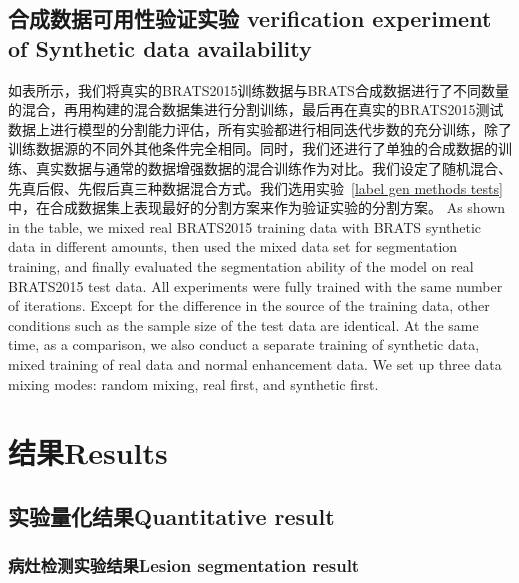 \documentclass[letterpaper]{article} %
\begin{document}
\subsection{合成数据可用性验证实验 verification experiment of Synthetic data availability}
如表所示，我们将真实的BRATS2015训练数据与BRATS合成数据进行了不同数量的混合，再用构建的混合数据集进行分割训练，最后再在真实的BRATS2015测试数据上进行模型的分割能力评估，所有实验都进行相同迭代步数的充分训练，除了训练数据源的不同外其他条件完全相同。同时，我们还进行了单独的合成数据的训练、真实数据与通常的数据增强数据的混合训练作为对比。我们设定了随机混合、先真后假、先假后真三种数据混合方式。我们选用实验~\ref{label gen methods tests}中，在合成数据集上表现最好的分割方案来作为验证实验的分割方案。
As shown in the table, we mixed real BRATS2015 training data with BRATS synthetic data in different amounts, then used the mixed data set for segmentation training, and finally evaluated the segmentation ability of the model on real BRATS2015 test data. All experiments were fully trained with the same number of iterations. Except for the difference in the source of the training data, other conditions such as the sample size of the test data are identical. At the same time, as a comparison, we also conduct a separate training of synthetic data, mixed training of real data and normal enhancement data. We set up three data mixing modes: random mixing, real first, and synthetic
first.

\section{结果Results}
\subsection{实验量化结果Quantitative result}

\subsubsection{病灶检测实验结果Lesion segmentation result}
\begin{table}[t]
	\caption{病灶检测实验结果.Lesion segmentation result}\smallskip
	\centering
	\label{label_test}	
\end{table}
\end{document}
